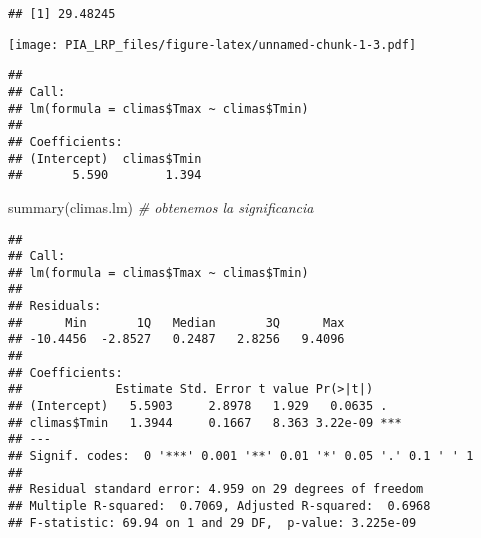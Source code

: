 \documentclass[
]{article}
\newenvironment{Shaded}{\begin{snugshade}}{\end{snugshade}}
\newcommand{\AttributeTok}[1]{\textcolor[rgb]{0.77,0.63,0.00}{#1}}
\newcommand{\CommentTok}[1]{\textcolor[rgb]{0.56,0.35,0.01}{\textit{#1}}}
\newcommand{\DecValTok}[1]{\textcolor[rgb]{0.00,0.00,0.81}{#1}}
\newcommand{\FunctionTok}[1]{\textcolor[rgb]{0.00,0.00,0.00}{#1}}
\newcommand{\NormalTok}[1]{#1}
\newcommand{\OtherTok}[1]{\textcolor[rgb]{0.56,0.35,0.01}{#1}}
\newcommand{\SpecialCharTok}[1]{\textcolor[rgb]{0.00,0.00,0.00}{#1}}
\newcommand{\StringTok}[1]{\textcolor[rgb]{0.31,0.60,0.02}{#1}}
\begin{document}
\begin{verbatim}
## [1] 29.48245
\end{verbatim}

\begin{Shaded}
\end{Shaded}

\texttt{[image: PIA\_LRP\_files/figure-latex/unnamed-chunk-1-3.pdf]}

\begin{Shaded}
\end{Shaded}

\begin{verbatim}
## 
## Call:
## lm(formula = climas$Tmax ~ climas$Tmin)
## 
## Coefficients:
## (Intercept)  climas$Tmin  
##       5.590        1.394
\end{verbatim}

\begin{Shaded}
\begin{Highlighting}[]
\FunctionTok{summary}\NormalTok{(climas.lm) }\CommentTok{\# obtenemos la significancia}
\end{Highlighting}
\end{Shaded}

\begin{verbatim}
## 
## Call:
## lm(formula = climas$Tmax ~ climas$Tmin)
## 
## Residuals:
##      Min       1Q   Median       3Q      Max 
## -10.4456  -2.8527   0.2487   2.8256   9.4096 
## 
## Coefficients:
##             Estimate Std. Error t value Pr(>|t|)    
## (Intercept)   5.5903     2.8978   1.929   0.0635 .  
## climas$Tmin   1.3944     0.1667   8.363 3.22e-09 ***
## ---
## Signif. codes:  0 '***' 0.001 '**' 0.01 '*' 0.05 '.' 0.1 ' ' 1
## 
## Residual standard error: 4.959 on 29 degrees of freedom
## Multiple R-squared:  0.7069, Adjusted R-squared:  0.6968 
## F-statistic: 69.94 on 1 and 29 DF,  p-value: 3.225e-09
\end{verbatim}
\end{document}
